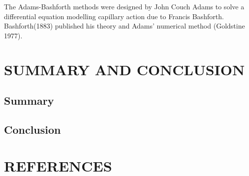 \documentclass[11pt]{report}
\newcommand{\NI}{\noindent}
\begin{document}
	\NI The Adams-Bashforth methods were designed by John Couch Adams to solve a differential equation modelling capillary action due to Francis Bashforth. Bashforth(1883) published his theory and Adams' numerical method (Goldstine 1977).
	
	
	
	
	
	
	
	
	\chapter{}
	
	



	
	\chapter{SUMMARY AND CONCLUSION}
	\section{Summary}
	
	
	\section{Conclusion}
	
	

	
	\chapter*{REFERENCES}
	
	\begin{description}
		\item 
	\end{description}
	
\end{document}
